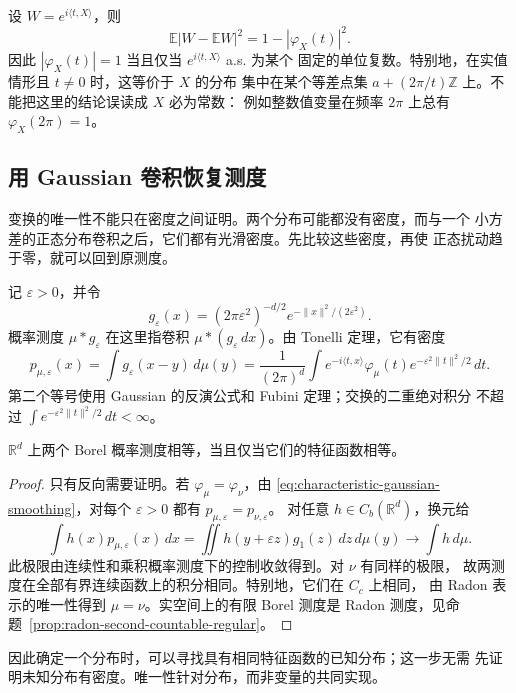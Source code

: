 设 $W=e^{i\langle t,X\rangle}$，则
\[
 \mathbb E|W-\mathbb E W|^2=1-|\varphi_X(t)|^2.
\]
因此 $|\varphi_X(t)|=1$ 当且仅当 $e^{i\langle t,X\rangle}$ a.s. 为某个
固定的单位复数。特别地，在实值情形且 $t\ne0$ 时，这等价于 $X$ 的分布
集中在某个等差点集
$a+(2\pi/t)\mathbb Z$ 上。不能把这里的结论误读成 $X$ 必为常数：
例如整数值变量在频率 $2\pi$ 上总有 $\varphi_X(2\pi)=1$。

\subsection{用 Gaussian 卷积恢复测度}

变换的唯一性不能只在密度之间证明。两个分布可能都没有密度，而与一个
小方差的正态分布卷积之后，它们都有光滑密度。先比较这些密度，再使
正态扰动趋于零，就可以回到原测度。

记 $\varepsilon>0$，并令
\[
 g_\varepsilon(x)=(2\pi\varepsilon^2)^{-d/2}
             e^{-\|x\|^2/(2\varepsilon^2)}.
\]
概率测度 $\mu*g_\varepsilon$ 在这里指卷积
$\mu*(g_\varepsilon\,dx)$。由 Tonelli 定理，它有密度
\begin{equation}
\label{eq:characteristic-gaussian-smoothing}
 p_{\mu,\varepsilon}(x)
 =\int g_\varepsilon(x-y)\,d\mu(y)
 =\frac1{(2\pi)^d}\int e^{-i\langle t,x\rangle}
        \varphi_\mu(t)e^{-\varepsilon^2\|t\|^2/2}\,dt.
\end{equation}
第二个等号使用 Gaussian 的反演公式和 Fubini 定理；交换的二重绝对积分
不超过 $\int e^{-\varepsilon^2\|t\|^2/2}\,dt<\infty$。

\begin{theorem}[特征函数的唯一性]
\label{thm:characteristic-uniqueness}
$\mathbb R^d$ 上两个 Borel 概率测度相等，当且仅当它们的特征函数相等。
\end{theorem}

\begin{proof}
只有反向需要证明。若 $\varphi_\mu=\varphi_\nu$，由
\eqref{eq:characteristic-gaussian-smoothing}，对每个 $\varepsilon>0$ 都有
$p_{\mu,\varepsilon}=p_{\nu,\varepsilon}$。
对任意 $h\in C_b(\mathbb R^d)$，换元给
\[
 \int h(x)p_{\mu,\varepsilon}(x)\,dx
 =\iint h(y+\varepsilon z)g_1(z)\,dz\,d\mu(y)
 \longrightarrow\int h\,d\mu.
\]
此极限由连续性和乘积概率测度下的控制收敛得到。对 $\nu$ 有同样的极限，
故两测度在全部有界连续函数上的积分相同。特别地，它们在 $C_c$ 上相同，
由 Radon 表示的唯一性得到 $\mu=\nu$。实空间上的有限 Borel 测度是
Radon 测度，见命题~\ref{prop:radon-second-countable-regular}。
\end{proof}

因此确定一个分布时，可以寻找具有相同特征函数的已知分布；这一步无需
先证明未知分布有密度。唯一性针对分布，而非变量的共同实现。

